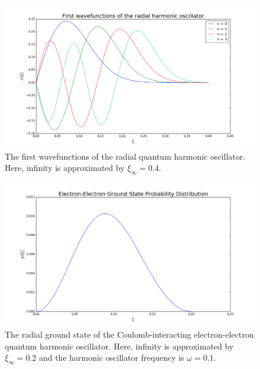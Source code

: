 \documentclass[reprint,english]{revtex4-1}
\begin{document}
\begin{figure}[ht]
\centering
\includegraphics[scale=0.25]{HarmonicOscillator/plots/wavefunction80_4.png}
\caption{The first wavefunctions of the radial quantum harmonic oscillator. Here, infinity is approximated by \(\xi_\infty=0.4\).}
\label{fig:harmonicoscillator_eigenvectors2}
\end{figure}
\begin{figure}[ht]
\centering
\includegraphics[scale=0.25]{InteractingElectrons/plots/prob200_1.png}
\caption{The radial ground state of the Coulomb-interacting electron-electron quantum harmonic oscillator. Here, infinity is approximated by \(\xi_\infty=0.2\) and the harmonic oscillator frequency is \(\omega=0.1\).}
\label{fig:interactingelectrons_eigenvectors1}
\end{figure}
\end{document}
